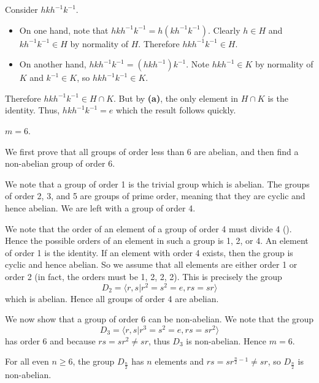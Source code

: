 \begin{questions}
\begin{partquestions}{\alph*}
        \item Consider $hkh^{-1}k^{-1}$.
        \begin{itemize}
            \item On one hand, note that $hkh^{-1}k^{-1} = h(kh^{-1}k^{-1})$. Clearly $h \in H$ and $kh^{-1}k^{-1} \in H$ by normality of $H$. Therefore $hkh^{-1}k^{-1} \in H$.
            \item On another hand, $hkh^{-1}k^{-1} = (hkh^{-1})k^{-1}$. Note $hkh^{-1} \in K$ by normality of $K$ and $k^{-1} \in K$, so $hkh^{-1}k^{-1} \in K$.
        \end{itemize}
        Therefore $hkh^{-1}k^{-1} \in H \cap K$. But by \textbf{(a)}, the only element in $H \cap K$ is the identity. Thus, $hkh^{-1}k^{-1} = e$ which the result follows quickly.
    \end{partquestions}

    \item \begin{partquestions}{\alph*}
        \item $m = 6$.
        \item We first prove that all groups of order less than 6 are abelian, and then find a non-abelian group of order 6.

        We note that a group of order 1 is the trivial group which is abelian. The groups of order 2, 3, and 5 are groups of prime order, meaning that they are cyclic and hence abelian. We are left with a group of order 4.

        We note that the order of an element of a group of order 4 must divide 4 (). Hence the possible orders of an element in such a group is 1, 2, or 4. An element of order 1 is the identity. If an element with order 4 exists, then the group is cyclic and hence abelian. So we assume that all elements are either order 1 or order 2 (in fact, the orders must be 1, 2, 2, 2). This is precisely the group
        \[
            D_2 = \langle r, s \vert r^2 = s^2 = e, rs = sr\rangle
        \]
        which is abelian. Hence all groups of order 4 are abelian.

        We now show that a group of order 6 can be non-abelian. We note that the group
        \[
            D_3 =  \langle r, s \vert r^3 = s^2 = e, rs = sr^2\rangle
        \]
        has order 6 and because $rs = sr^2 \neq sr$, thus $D_3$ is non-abelian. Hence $m = 6$.

        \item For all even $n \geq 6$, the group $D_{\frac n2}$ has $n$ elements and $rs = sr^{\frac n2 - 1} \neq sr$, so $D_{\frac n2}$ is non-abelian.
    \end{partquestions}


\end{questions}
